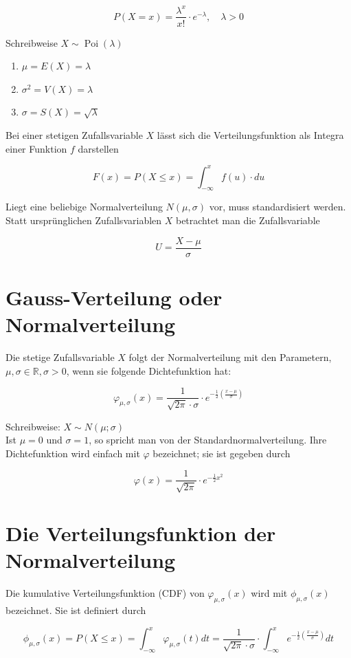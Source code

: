 \documentclass[10pt]{article}
\begin{document}
$$
P(X=x)=\frac{\lambda^{x}}{x!} \cdot e^{-\lambda}, \quad \lambda>0
$$

Schreibweise $X \sim \operatorname{Poi}(\lambda)$

\begin{enumerate}
  \item $\mu=E(X)=\lambda$
  \item $\sigma^{2}=V(X)=\lambda$
  \item $\sigma=S(X)=\sqrt{\lambda}$
\end{enumerate}

Bei einer stetigen Zufallsvariable $X$ lässt sich die Verteilungsfunktion als Integra einer Funktion $f$ darstellen

$$
F(x)=P(X \leq x)=\int_{-\infty}^{x} f(u) \cdot d u
$$

Liegt eine beliebige Normalverteilung $N(\mu, \sigma)$ vor, muss standardisiert werden. Statt ursprünglichen Zufallsvariablen $X$ betrachtet man die Zufallsvariable

$$
U=\frac{X-\mu}{\sigma}
$$

\section*{Gauss-Verteilung oder Normalverteilung}
Die stetige Zufallsvariable $X$ folgt der Normalverteilung mit den Parametern, $\mu, \sigma \in \mathbb{R}, \sigma>0$, wenn sie folgende Dichtefunktion hat:

$$
\varphi_{\mu, \sigma}(x)=\frac{1}{\sqrt{2 \pi} \cdot \sigma} \cdot e^{-\frac{1}{2}\left(\frac{x-\mu}{\sigma}\right)}
$$

Schreibweise: $X \sim N(\mu ; \sigma)$\\
Ist $\mu=0$ und $\sigma=1$, so spricht man von der Standardnormalverteilung. Ihre Dichtefunktion wird einfach mit $\varphi$ bezeichnet; sie ist gegeben durch

$$
\varphi(x)=\frac{1}{\sqrt{2 \pi}} \cdot e^{-\frac{1}{2} x^{2}}
$$

\section*{Die Verteilungsfunktion der Normalverteilung}
Die kumulative Verteilungsfunktion (CDF) von $\varphi_{\mu, \sigma}(x)$ wird mit $\phi_{\mu, \sigma}(x)$\\
bezeichnet. Sie ist definiert durch

$$
\phi_{\mu, \sigma}(x)=P(X \leq x)=\int_{-\infty}^{x} \varphi_{\mu, \sigma}(t) d t=\frac{1}{\sqrt{2 \pi} \cdot \sigma} \cdot \int_{-\infty}^{x} e^{-\frac{1}{2}\left(\frac{x-\mu}{\sigma}\right)} d t
$$
\end{document}
